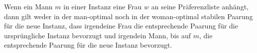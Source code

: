 \begin{frame}
  \begin{Theorem}
  \label{element_enfuegen}
    Wenn ein Mann $m$ in einer Instanz eine Frau $w$ an seine Prä\-fe\-renz\-lis\-te anhängt, dann gilt weder in der man-optimal noch in der woman-optimal stabilen Paarung für die neue Instanz, dass irgendeine Frau die entsprechende Paarung für die ursprüngliche Instanz bevorzugt und irgendein Mann, bis auf $m$, die entsprechende Paarung für die neue Instanz bevorzugt.
  \end{Theorem}


\end{frame}
